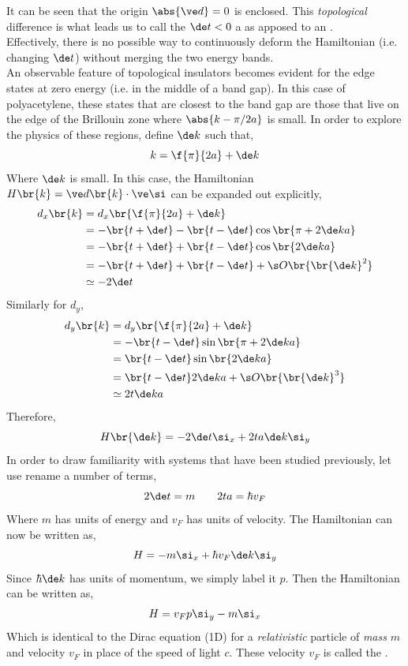\documentclass{article}
\begin{document}
It can be seen that the origin $\abs{\ve d} = 0$ is enclosed. This \textit{topological} difference is what leads us to call the $\de t < 0$ a  as apposed to an .\\

Effectively, there is no possible way to continuously deform the Hamiltonian (i.e. changing $\de t$) without merging the two energy bands. \\

An observable feature of topological insulators becomes evident for the edge states at zero energy (i.e. in the middle of a band gap). In this case of polyacetylene, these states that are closest to the band gap are those that live on the edge of the Brillouin zone where $\abs{k - \pi / 2a}$ is small. In order to explore the physics of these regions, define $\de k$ such that,
\[ k = \f{\pi}{2a} + \de k \]
Where $\de k$ is small. In this case, the Hamiltonian $H\br{k} = \ve d \br{k} \cdot \ve \si$ can be expanded out explicitly,
\begin{align*}
    d_x\br{k}
    &= d_x\br{\f{\pi}{2a} + \de k} \\
    &= - \br{t + \de t} - \br{t - \de t} \cos \br{\pi + 2 \de k a} \\
    &= - \br{t + \de t} + \br{t - \de t} \cos \br{2 \de k a} \\
    &= - \br{t + \de t} + \br{t - \de t} + \s O \br{\br{\de k}^2} \\
    &\simeq - 2 \de t
\end{align*}
Similarly for $d_y$,
\begin{align*}
    d_y\br{k}
    &= d_y\br{\f{\pi}{2a} + \de k} \\
    &= - \br{t - \de t} \sin \br{\pi + 2 \de k a} \\
    &= \br{t - \de t} \sin \br{2 \de k a} \\
    &= \br{t - \de t} 2 \de k a + \s O \br{\br{\de k}^3} \\
    &\simeq 2 t \de k a
\end{align*}
Therefore,
\[ H\br{\de k} = - 2 \de t \si_x + 2 t a \de k \si_y \]
In order to draw familiarity with systems that have been studied previously, let use rename a number of terms,
\[ 2 \de t = m \qquad 2 t a = \hbar v_F\]
Where $m$ has units of energy and $v_F$ has units of velocity. The Hamiltonian can now be written as,
\[ H = - m \si_x + \hbar v_F \de k \si_y \]
Since $\hbar \de k$ has units of momentum, we simply label it $p$. Then the Hamiltonian can be written as,
\[ H = v_F p \si_y - m \si_x \]
Which is identical to the Dirac equation (1D) for a \textit{relativistic} particle of \textit{mass} $m$ and velocity $v_F$ in place of the speed of light $c$. These velocity $v_F$ is called the .
\end{document}
